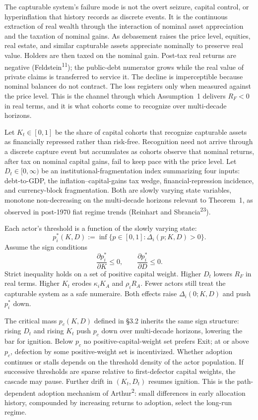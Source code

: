 \documentclass[12pt]{article}
\theoremstyle{definition}
\theoremstyle{remark}
\begin{document}
The capturable system's failure mode is not the overt seizure,
capital control, or hyperinflation that history records as
discrete events. It is the continuous extraction of real wealth
through the interaction of nominal asset appreciation and the
taxation of nominal gains. As debasement raises the price level,
equities, real estate, and similar capturable assets appreciate
nominally to preserve real value. Holders are then taxed on the
nominal gain. Post-tax real returns are negative (Feldstein\textsuperscript{11}); the public-debt
numerator grows while the real value of private claims is
transferred to service it. The decline is imperceptible because
nominal balances do not contract. The loss registers only when
measured against the price level. This is the channel through which
Assumption~1 delivers $R_F < 0$ in real terms, and it is what
cohorts come to recognize over multi-decade horizons.

Let $K_t \in [0,1]$ be the share of capital cohorts that recognize
capturable assets as financially repressed rather than risk-free. Recognition need not arrive through a discrete capture event but accumulates as cohorts observe that nominal returns, after tax on nominal capital gains, fail to keep pace with the price level. Let $D_t \in [0, \infty)$ be an
institutional-fragmentation index summarizing four inputs: debt-to-GDP,
the inflation--capital-gains tax wedge, financial-repression incidence,
and currency-block fragmentation. Both are slowly varying
state variables, monotone non-decreasing on the multi-decade
horizons relevant to Theorem~1, as observed in post-1970 fiat
regime trends (Reinhart and Sbrancia\textsuperscript{23}).

Each actor's threshold is a function of the slowly varying state:
\[
p_i^*(K, D) := \inf\{p \in [0, 1] : \Delta_i(p; K, D) > 0\}.
\]
Assume the sign conditions
\[
\frac{\partial p_i^*}{\partial K} \leq 0, \qquad
\frac{\partial p_i^*}{\partial D} \leq 0.
\]
Strict inequality holds on a set of positive capital weight. Higher $D_t$ lowers $R_F$ in real terms. Higher $K_t$ erodes $\kappa_i K_A$ and $\rho_i R_A$. Fewer actors still treat the capturable system as a safe numeraire. Both
effects raise $\Delta_i(0; K, D)$ and push $p_i^*$ down.

The critical mass $p_c(K, D)$ defined in \S3.2 inherits the same
sign structure: rising $D_t$ and rising $K_t$ push $p_c$ down over multi-decade horizons, lowering
the bar for ignition. Below $p_c$ no positive-capital-weight set
prefers Exit; at or above $p_c$, defection by some positive-weight
set is incentivized. Whether adoption continues or stalls depends on the threshold density of the actor population. If successive thresholds are sparse relative to first-defector capital weights, the cascade may pause. Further drift in $(K_t, D_t)$ resumes ignition. This is
the path-dependent adoption mechanism of Arthur\textsuperscript{2}:
small differences in early allocation history, compounded by
increasing returns to adoption, select the long-run regime.
\end{document}
